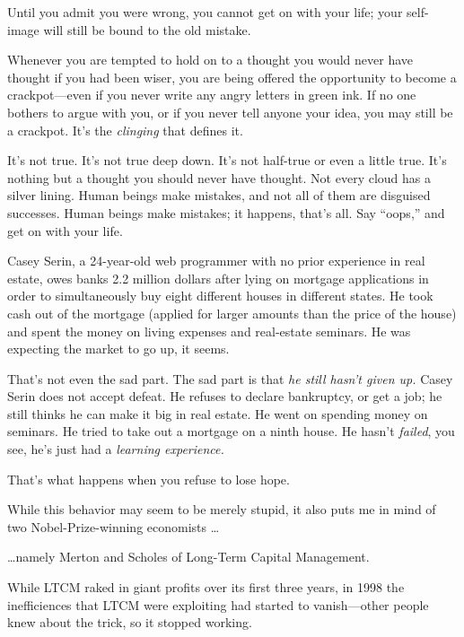 {
 Until you admit you were wrong, you cannot get on with your life;
your self-image will still be bound to the old mistake.}

{
 Whenever you are tempted to hold on to a thought you would never
have thought if you had been wiser, you are being offered the
opportunity to become a crackpot---even if you never write any angry
letters in green ink. If no one bothers to argue with you, or if you
never tell anyone your idea, you may still be a crackpot.
It's the \textit{clinging} that defines it.}

{
 It's not true. It's not true deep
down. It's not half-true or even a little true.
It's nothing but a thought you should never have
thought. Not every cloud has a silver lining. Human beings make
mistakes, and not all of them are disguised successes. Human beings
make mistakes; it happens, that's all. Say
``oops,'' and get on with your
life.}

\myendsectiontext


{
 Casey Serin, a 24-year-old web programmer with no prior experience
in real estate, owes banks 2.2 million dollars after lying on mortgage
applications in order to simultaneously buy eight different houses in
different states. He took cash out of the mortgage (applied for larger
amounts than the price of the house) and spent the money on living
expenses and real-estate seminars. He was expecting the market to go
up, it seems. }

{
 That's not even the sad part. The sad part is that
\textit{he still hasn't given up.} Casey Serin does not
accept defeat. He refuses to declare bankruptcy, or get a job; he still
thinks he can make it big in real estate. He went on spending money on
seminars. He tried to take out a mortgage on a ninth house. He
hasn't \textit{failed}, you see, he's
just had a \textit{learning experience.}}

{
 That's what happens when you refuse to lose hope.}

{
 While this behavior may seem to be merely stupid, it also puts me
in mind of two Nobel-Prize-winning economists \ldots}

{
 \ldots namely Merton and Scholes of Long-Term Capital Management.}

{
 While LTCM raked in giant profits over its first three years, in
1998 the inefficiences that LTCM were exploiting had started to
vanish---other people knew about the trick, so it stopped working.}

